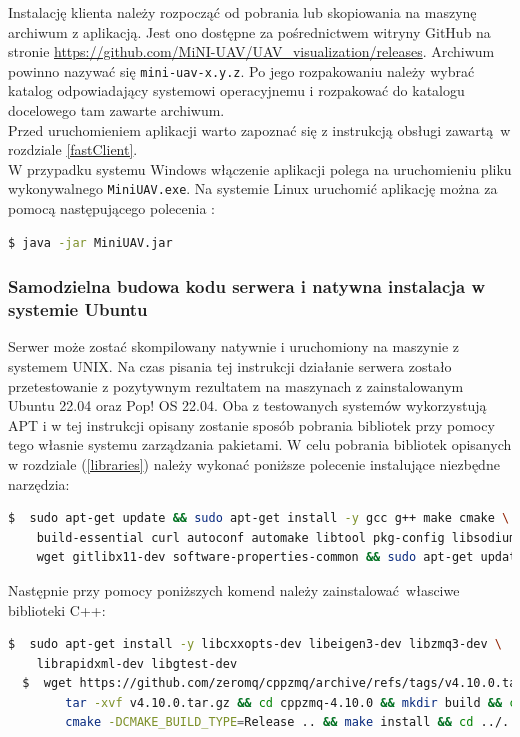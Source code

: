 \documentclass[15pt]{sprawozdanie}
\begin{document}
Instalację klienta należy rozpocząć od pobrania lub skopiowania na maszynę archiwum z aplikacją. Jest ono dostępne za pośrednictwem witryny GitHub na stronie \url{https://github.com/MiNI-UAV/UAV\_visualization/releases}. Archiwum powinno nazywać się \texttt{mini-uav-x.y.z}. Po jego rozpakowaniu należy wybrać katalog odpowiadający systemowi operacyjnemu i rozpakować do katalogu docelowego tam zawarte archiwum. \\

Przed uruchomieniem aplikacji warto zapoznać się z instrukcją obsługi zawartą w rozdziale \ref{fastClient}. \\

W przypadku systemu Windows włączenie aplikacji polega na uruchomieniu pliku wykonywalnego \texttt{MiniUAV.exe}. Na systemie Linux uruchomić aplikację można za pomocą następującego polecenia :

\begin{lstlisting}[language=bash]
  $ java -jar MiniUAV.jar
\end{lstlisting}

\subsubsection{Samodzielna budowa kodu serwera i natywna instalacja w systemie Ubuntu}

Serwer może zostać skompilowany natywnie i uruchomiony na maszynie z systemem UNIX. Na czas pisania tej instrukcji działanie serwera zostało przetestowanie z pozytywnym rezultatem na maszynach z zainstalowanym Ubuntu 22.04 oraz Pop! OS 22.04. Oba z testowanych systemów wykorzystują APT i w tej instrukcji opisany zostanie sposób pobrania bibliotek przy pomocy tego własnie systemu zarządzania pakietami. W celu pobrania bibliotek opisanych w rozdziale (\ref{libraries}) należy wykonać poniższe polecenie instalujące niezbędne narzędzia:
\begin{lstlisting}[language=bash]
  $  sudo apt-get update && sudo apt-get install -y gcc g++ make cmake \ 
	build-essential curl autoconf automake libtool pkg-config libsodium-dev \
 	wget gitlibx11-dev software-properties-common && sudo apt-get update 
\end{lstlisting}

Następnie przy pomocy poniższych komend należy zainstalować własciwe biblioteki C++:
\begin{lstlisting}[language=bash]
  $  sudo apt-get install -y libcxxopts-dev libeigen3-dev libzmq3-dev \
	librapidxml-dev libgtest-dev 
  $  wget https://github.com/zeromq/cppzmq/archive/refs/tags/v4.10.0.tar.gz && \
    	tar -xvf v4.10.0.tar.gz && cd cppzmq-4.10.0 && mkdir build && cd build && \
    	cmake -DCMAKE_BUILD_TYPE=Release .. && make install && cd ../..
\end{lstlisting}
\end{document}
